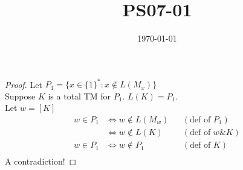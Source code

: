 \documentclass{article}
\title{PS07-01}
\date{\today}
\begin{document}
\maketitle
\begin{proof}
\noindent Let $P_1 = \{x \in \{1\}^* : x \notin L(M_x)\}$\\
Suppose $K$ is a total TM for $P_1$. $L(K) = P_1$.\\
Let $w = [K]$\\
\begin{align*}
w \in P_1 &\Leftrightarrow w \notin L(M_w) && (\text{def of }P_1)\\
&\Leftrightarrow w \notin L(K) && (\text{def of } w \& K)\\
w \in P_1 &\Leftrightarrow w \notin P_1 && (\text{def of }K)\\
\end{align*}
A contradiction!
\end{proof}
\end{document}

